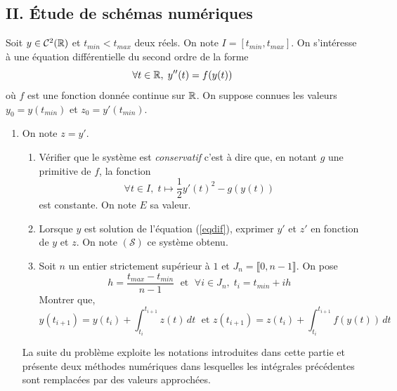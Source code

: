 \subsection*{II. \'Etude de schémas numériques}
Soit $y \in \mathcal{C}^2(\mathbb{R})$ et $t_{min} < t_{max}$ deux réels. On note $I = \left[t_{min}, t_{max} \right]$. On s'intéresse à une équation différentielle du second ordre de la forme
\begin{equation}
  \forall t \in \mathbb{R}, \; y''(t) = f(y(t)) \label{eqdif}
\end{equation}
où $f$ est une fonction donnée continue sur $\mathbb{R}$.\newline
On suppose connues les valeurs $y_0=y(t_{min})$ et $z_0=y'(t_{min})$.
\begin{enumerate}
  \item On note $z=y'$.
\begin{enumerate}
  \item Vérifier que le système est \emph{conservatif} c'est à dire que, en notant $g$ une primitive de $f$, la fonction
\begin{displaymath}
  \forall t \in I, \; t \mapsto \frac{1}{2}y'(t)^2 - g(y(t))
\end{displaymath}
est constante. On note $E$ sa valeur. 
  \item Lorsque $y$ est solution de l'équation (\ref{eqdif}), exprimer $y'$ et $z'$ en fonction de $y$ et $z$. On note $(\mathcal{S})$ ce système obtenu.
  \item Soit $n$ un entier strictement supérieur à $1$ et $J_n = \llbracket 0, n-1\rrbracket$. On pose
\begin{displaymath}
  h = \frac{t_{max} - t_{min}}{n-1} \; \text{ et } \; \forall i\in J_n,\;t_i = t_{min} + i h
\end{displaymath}
Montrer que, 
\begin{equation}
  y(t_{i+1}) = y(t_i) + \int_{t_i}^{t_{i+1}}z(t)\, dt \;\text{ et } 
  z(t_{i+1}) = z(t_i) + \int_{t_i}^{t_{i+1}}f(y(t))\, dt \label{relint}
\end{equation}
\end{enumerate}
La suite du problème exploite les notations introduites dans cette partie et présente deux méthodes numériques dans lesquelles les intégrales précédentes sont remplacées par des valeurs approchées.


\end{enumerate}
